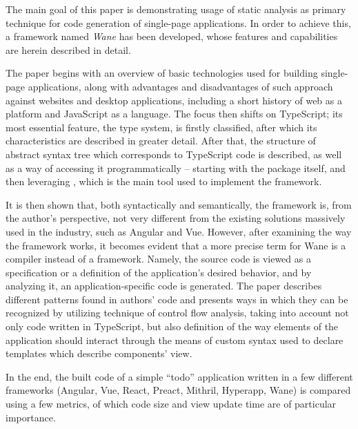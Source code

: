 The main goal of this paper is demonstrating usage of static analysis as primary technique for code generation of single-page applications.
In order to achieve this, a framework named \textit{Wane} has been developed, whose features and capabilities are herein described in detail.

The paper begins with an overview of basic technologies used for building single-page applications, along with advantages and disadvantages of such approach against websites and desktop applications, including a short history of web as a platform and JavaScript as a language.
The focus then shifts on TypeScript; its most essential feature, the type system, is firstly classified, after which its characteristics are described in greater detail.
After that, the structure of abstract syntax tree which corresponds to TypeScript code is described, as well as a way of accessing it programmatically -- starting with the package  itself, and then leveraging , which is the main tool used to implement the framework.

It is then shown that, both syntactically and semantically, the framework is, from the author's perspective, not very different from the existing solutions massively used in the industry, such as Angular and Vue.
However, after examining the way the framework works, it becomes evident that a more precise term for Wane is a compiler instead of a framework.
Namely, the source code is viewed as a specification or a definition of the application's desired behavior, and by analyzing it, an application-specific code is generated.
The paper describes different patterns found in authors' code and presents ways in which they can be recognized by utilizing technique of control flow analysis, taking into account not only code written in TypeScript, but also definition of the way elements of the application should interact through the means of custom syntax used to declare templates which describe components' view.

In the end, the built code of a simple ``todo'' application written in a few different frameworks (Angular, Vue, React, Preact, Mithril, Hyperapp, Wane) is compared using a few metrics, of which code size and view update time are of particular importance.
